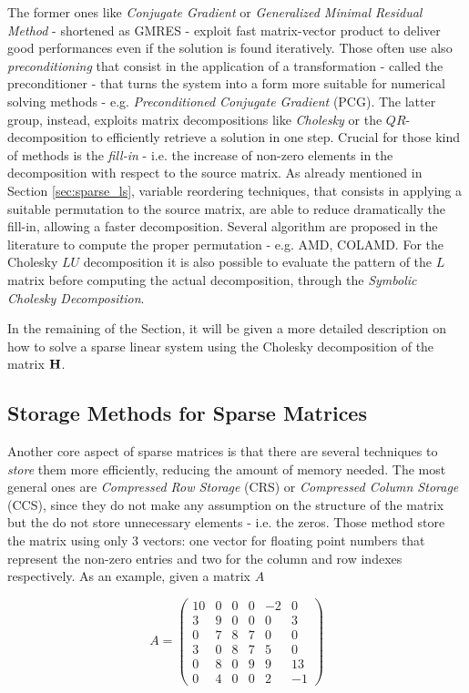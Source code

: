 \noindent The former ones like \textit{Conjugate Gradient} or \textit{Generalized Minimal Residual Method} - shortened as GMRES - exploit fast matrix-vector product to deliver good performances even if the solution is found iteratively. Those often use also \textit{preconditioning} that consist in the application of a transformation - called the preconditioner - that turns the system into a form more suitable for numerical solving methods - e.g. \textit{Preconditioned Conjugate Gradient} (PCG). The latter group, instead, exploits matrix decompositions like \textit{Cholesky} or the $QR$-decomposition to efficiently retrieve a solution in one step. Crucial for those kind of methods is the \textit{fill-in} - i.e. the increase of non-zero elements in the decomposition with respect to the source matrix. As already mentioned in Section \ref{sec:sparse_ls}, variable reordering techniques, that consists in applying a suitable permutation to the source matrix, are able to reduce dramatically the fill-in, allowing a faster decomposition. Several algorithm are proposed in the literature to compute the proper permutation - e.g. AMD, COLAMD. For the Cholesky $LU$ decomposition it is also possible to evaluate the pattern of the $L$ matrix before computing the actual decomposition, through the \textit{Symbolic Cholesky Decomposition}. 

In the remaining of the Section, it will be given a more detailed description on how to solve a sparse linear system using the Cholesky decomposition of the matrix $\mathbf{H}$.

\subsection{Storage Methods for Sparse Matrices}\label{subsec:sparse_storage_methods}
Another core aspect of sparse matrices is that there are several techniques to \textit{store} them more efficiently, reducing the amount of memory needed. The most general ones are \textit{Compressed Row Storage} (CRS) or \textit{Compressed Column Storage} (CCS), since they do not make any assumption on the structure of the matrix but the do not store unnecessary elements - i.e. the zeros. Those method store the matrix using only 3 vectors: one vector for floating point numbers that represent the non-zero entries and two for the column and row indexes respectively. As an example, given a matrix $A$

\begin{equation*}
    A = 
        \begin{pmatrix}
            10 & 0 & 0 & 0 & -2 & 0 \\
            3 & 9 & 0 & 0 & 0 & 3 \\
            0 & 7 & 8 & 7 & 0 & 0 \\
            3 & 0 & 8 & 7 & 5 & 0 \\
            0 & 8 & 0 & 9 & 9 & 13 \\
            0 & 4 & 0 & 0 & 2 & -1 
        \end{pmatrix}
\end{equation*}

